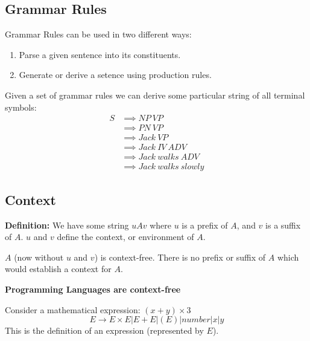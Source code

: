 \documentclass{scrartcl}
\begin{document}
\subsection{Grammar Rules}
Grammar Rules can be used in two different ways:
\begin{enumerate}
\item Parse a given sentence into its constituents.
\item Generate or derive a setence using production rules.
\end{enumerate}

Given a set of grammar rules we can derive some particular string of all terminal symbols:
\begin{align*}
S &\implies NP\ VP\\
  &\implies PN\ VP\\
  &\implies Jack\ VP\\
  &\implies Jack\ IV\ ADV\\
  &\implies Jack\ walks\ ADV\\
  &\implies Jack\ walks\ slowly
\end{align*}

\subsection{Context}

\textbf{Definition:} We have some string $uAv$ where $u$ is a prefix of $A$, and $v$ is a suffix of $A$. $u$ and $v$ define the context, or environment of $A$.

$A$ (now without $u$ and $v$) is context-free. There is no prefix or suffix of $A$ which would establish a context for $A$.

\begin{center}
\textbf{Programming Languages are context-free}
\end{center}
Consider a mathematical expression: $(x+y)\times3$\\
$$E\rightarrow E\times E | E + E | (E) | number | x | y$$
This is the definition of an expression (represented by $E$).
\end{document}
